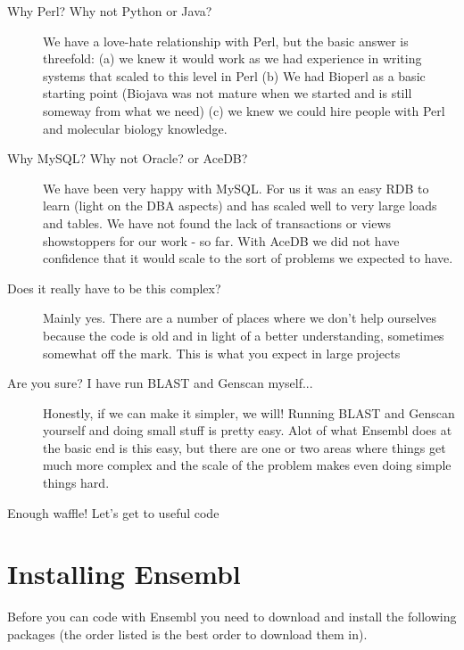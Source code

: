 \documentclass[11pt,a4paper]{article}
\begin{document}
\begin{description}

\item[Why Perl? Why not Python or Java?] We have a love-hate
relationship with Perl, but the basic answer is threefold: (a) we knew
it would work as we had experience in writing systems that scaled to
this level in Perl (b) We had Bioperl as a basic starting point
(Biojava was not mature when we started and is still someway from what
we need) (c) we knew we could hire people with Perl and molecular
biology knowledge.

\item[Why MySQL? Why not Oracle? or AceDB?] We have been very happy
with MySQL.  For us it was an easy RDB to learn (light on the DBA
aspects) and has scaled well to very large loads and tables. We have
not found the lack of transactions or views showstoppers for our work
- so far. With AceDB we did not have confidence that it would scale to
the sort of problems we expected to have.

\item[Does it really have to be this complex?] Mainly yes. There are a
number of places where we don't help ourselves because the code is old
and in light of a better understanding, sometimes somewhat off the
mark. This is what you expect in large projects

\item[Are you sure? I have run BLAST and Genscan myself...] Honestly,
if we can make it simpler, we will! Running BLAST and Genscan yourself
and doing small stuff is pretty easy. Alot of what Ensembl does at the
basic end is this easy, but there are one or two areas where things
get much more complex and the scale of the problem makes even doing
simple things hard.

\end{description}

Enough waffle! Let's get to useful code

\section{Installing Ensembl}

Before you can code with Ensembl you need to download and install the
following packages (the order listed is the best order to download them in).
\end{document}
